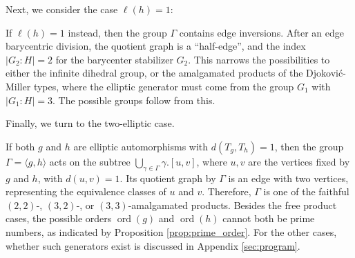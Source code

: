 \documentclass[12pt,leqno]{amsart}
\makeatletter
\renewenvironment{proof}[1][\proofname]{%
	\par
	\pushQED{\qed}%
	\normalfont
	\topsep6\p@\@plus6\p@\relax
	\trivlist
	\item[\hskip\labelsep\itshape #1\@addpunct{.}]%
	\ignorespaces
}{%
	\par\nobreak\vspace{2pt}%
	\popQED%
	\medskip%
	\endtrivlist
	\@endpefalse
}
\newcommand{\2}{L^2_{\rm per}(0, T)}
\newcommand{\ord}{{\operatorname{ord}}}
\numberwithin{equation}{section}
\numberwithin{figure}{section}
\makeatother
\begin{document}
Next, we consider the case $\ell(h) = 1$:
\begin{proof}[Proof of Corollary \ref{cor:translation_1}]
    If $\ell(h) = 1$ instead, then the group $\Gamma$ contains edge inversions. After an edge barycentric division, the quotient graph is a ``half-edge'', and the index $\lvert G_2: H\rvert = 2$ for the barycenter stabilizer $G_2$. This narrows the possibilities to either the infinite dihedral group, or the amalgamated products of the Djokovi\'c-Miller types, where the elliptic generator must come from the group $G_1$ with $\lvert G_1: H\rvert = 3$. The possible groups follow from this.
\end{proof}
Finally, we turn to the two-elliptic case.
\begin{proof}[Proof of Corollary \ref{cor:two_ellip}]
    If both $g$ and $h$ are elliptic automorphisms with $d(T_g,T_h) = 1$, then the group $\Gamma = \langle g,h\rangle$ acts on the subtree $\bigcup_{\gamma\in\Gamma}\gamma.[u,v]$, where $u,v$ are the vertices fixed by $g$ and $h$, with $d(u,v) = 1$. Its quotient graph by $\Gamma$ is an edge with two vertices, representing the equivalence classes of $u$ and $v$. Therefore, $\Gamma$ is one of the faithful $(2,2)$-, $(3,2)$-, or $(3,3)$-amalgamated products. Besides the free product cases, the possible orders $\ord(g)$ and $\ord(h)$ cannot both be prime numbers, as indicated by Proposition \ref{prop:prime_order}. For the other cases, whether such generators exist is discussed in Appendix \ref{sec:program}.
\end{proof}
\end{document}
